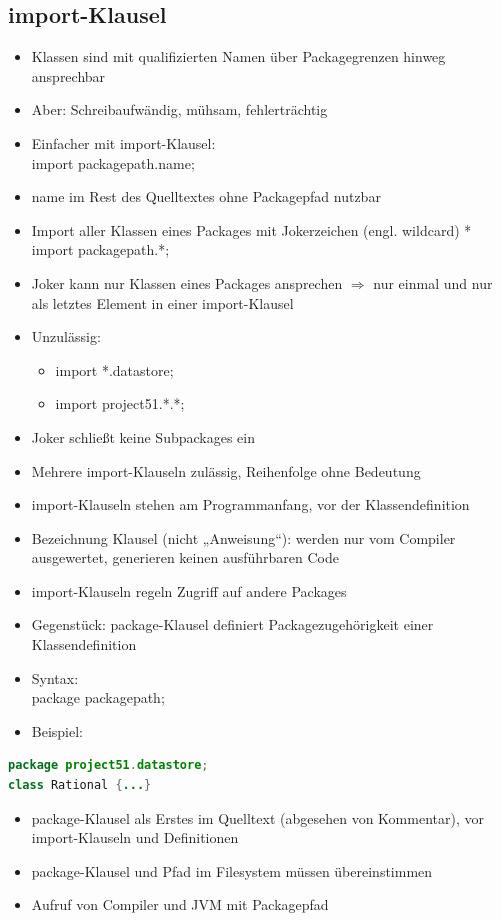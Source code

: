 \subsection{import-Klausel}
\begin{itemize}
\item Klassen sind mit qualifizierten Namen über Packagegrenzen hinweg ansprechbar
\item Aber: Schreibaufwändig, mühsam, fehlerträchtig
\item Einfacher mit import-Klausel:\\
import packagepath.name;
\item name im Rest des Quelltextes ohne Packagepfad nutzbar
\item Import aller Klassen eines Packages mit Jokerzeichen (engl. wildcard) *\\
import packagepath.*;
\item Joker kann nur Klassen eines Packages ansprechen $ \Rightarrow$ nur einmal und nur als letztes Element in einer import-Klausel
\item Unzulässig:
	\begin{itemize}
	\item import *.datastore;
	\item import project51.*.*;
	\end{itemize}
\item Joker schließt keine Subpackages ein
\item Mehrere import-Klauseln zulässig, Reihenfolge ohne Bedeutung
\item import-Klauseln stehen am Programmanfang, vor der Klassendefinition
\item Bezeichnung Klausel (nicht „Anweisung“): werden nur vom Compiler ausgewertet, generieren keinen ausführbaren Code
\item import-Klauseln regeln Zugriff auf andere Packages
\item Gegenstück: package-Klausel definiert Packagezugehörigkeit einer Klassendefinition
\item Syntax:\\
package packagepath;
\item Beispiel:
\end{itemize}
\begin{lstlisting}[language=JAVA]
package project51.datastore;
class Rational {...}
\end{lstlisting}
\begin{itemize}
\item package-Klausel als Erstes im Quelltext (abgesehen von Kommentar), vor import-Klauseln und Definitionen
\item package-Klausel und Pfad im Filesystem müssen übereinstimmen
\item Aufruf von Compiler und JVM mit Packagepfad
\end{itemize}


